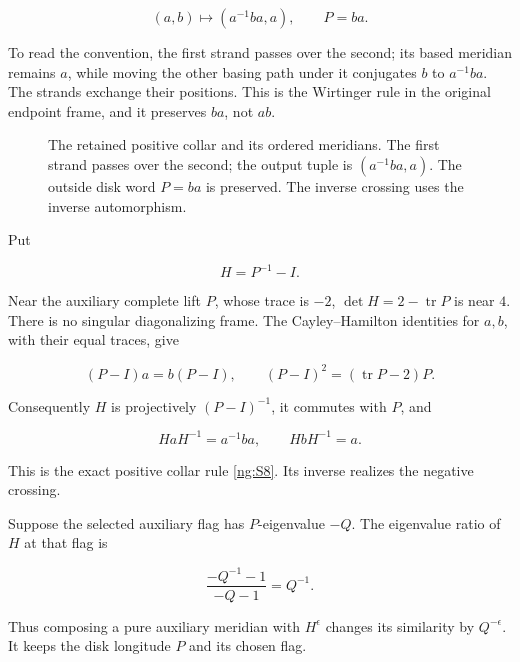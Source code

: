 \begin{equation}\label{ng:S8}
(a,b)\longmapsto(a^{-1}ba,a),\qquad P=ba.
\end{equation}

To read the convention, the first strand passes over the second;
its based meridian remains $a$, while moving the other basing path
under it conjugates $b$ to $a^{-1}ba$. The strands exchange their
positions. This is the Wirtinger rule in the original endpoint frame,
and it preserves $ba$, not $ab$.
\begin{figure}[ht]
\centering
\caption{The retained positive collar and its ordered meridians.
The first strand passes over the second; the output tuple is
$(a^{-1}ba,a)$. The outside disk word $P=ba$ is preserved.
The inverse crossing uses the inverse automorphism.}
\label{ng:hurwitz-figure}
\end{figure}

Put

\begin{equation}\label{ng:S9}
H=P^{-1}-I.
\end{equation}

Near the auxiliary complete lift \(P\), whose trace is \(-2\),
\(\det H=2-\operatorname{tr}P\) is near \(4\).
There is no singular diagonalizing frame.
The Cayley--Hamilton identities for \(a,b\), with their equal
traces, give

\begin{equation}\label{ng:S10}
(P-I)a=b(P-I),\qquad
 (P-I)^2=(\operatorname{tr}P-2)P.
\end{equation}

Consequently \(H\) is projectively \((P-I)^{-1}\), it
commutes with \(P\), and

\begin{equation}\label{ng:S11}
HaH^{-1}=a^{-1}ba,\qquad HbH^{-1}=a.
\end{equation}

This is the exact positive collar rule \eqref{ng:S8}. Its inverse realizes
the negative crossing.

Suppose the selected auxiliary flag has \(P\)-eigenvalue
\(-Q\). The eigenvalue ratio of \(H\) at that flag is

\begin{equation}\label{ng:S12}
\frac{-Q^{-1}-1}{-Q-1}=Q^{-1}.
\end{equation}

Thus composing a pure auxiliary meridian with \(H^\epsilon\)
changes its similarity by \(Q^{-\epsilon}\). It keeps the
disk longitude \(P\) and its chosen flag.

